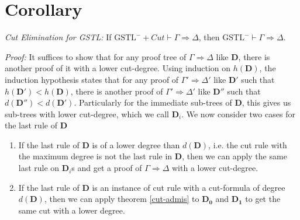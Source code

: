 \documentclass[a4paper, 12pt]{paper}
\begin{document}
\section{Corollary} \emph{Cut Elimination for GSTL: }
If $\text{GSTL}^- + Cut \vdash \Gamma \Rightarrow \Delta$, then $\text{GSTL}^- \vdash \Gamma \Rightarrow \Delta$.

\emph{Proof:} It suffices to show that for any proof tree of $\Gamma \Rightarrow \Delta$ like $\mathbf{D}$, there is another proof of it with a lower cut-degree. Using induction on $h(\mathbf{D})$, the induction hypothesis states that for any proof of $\Gamma' \Rightarrow \Delta'$ like $\mathbf{D'}$ such that $h(\mathbf{D'}) < h(\mathbf{D})$, there is another proof of $\Gamma' \Rightarrow \Delta'$ like $\mathbf{D''}$ such that $d(\mathbf{D''}) < d(\mathbf{D'})$. Particularly for the immediate sub-trees of $\mathbf{D}$, this gives us sub-trees with lower cut-degree, which we call $\mathbf{D}_i$. We now consider two cases for the last rule of $\mathbf{D}$

\begin{enumerate}[label=\Roman*]
	\item If the last rule of $\mathbf{D}$ is of a lower degree than $d(\mathbf{D})$, i.e. the cut rule with the maximum degree is not the last rule in $\mathbf{D}$, then we can apply the same last rule on $\mathbf{D}_i$s and get a proof of $\Gamma \Rightarrow \Delta$ with a lower cut-degree.
	
	\item If the last rule of $\mathbf{D}$ is an instance of cut rule with a cut-formula of degree $d(\mathbf{D})$, then we can apply theorem \ref{cut-admis} to $\mathbf{D_0}$ and $\mathbf{D_1}$ to get the same cut with a lower degree.
\end{enumerate}
\end{document}
